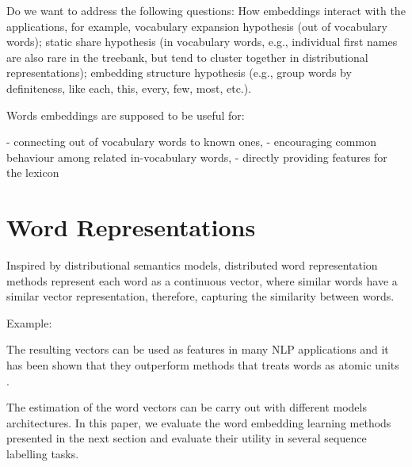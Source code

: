 \documentclass[11pt]{article}
\begin{document}



Do we want to address the following questions:
How embeddings interact with the applications, for example, vocabulary expansion hypothesis (out of vocabulary words); static share hypothesis (in vocabulary words, e.g., individual first names are also rare in the treebank, but tend to cluster together in distributional representations);
embedding structure hypothesis (e.g., group words by definiteness, like each, this, every, few, most, etc.).

Words embeddings are supposed to be useful for: 

- connecting out of vocabulary words to known ones, 
- encouraging common behaviour among related in-vocabulary words,
- directly providing features for the lexicon




\section{Word Representations}


Inspired by distributional semantics models, distributed word
representation methods represent each word as a continuous vector, where
similar words have a similar vector representation, therefore, capturing
the similarity between words.

Example: 

The resulting vectors can be used as features in many NLP applications and it has been shown that they outperform methods that treats words as atomic units \cite{}.

The estimation of the word vectors can be carry out with different models architectures. In this paper, we evaluate the word embedding learning methods presented in the next section and evaluate their utility in several sequence labelling tasks.
 
\end{document}
